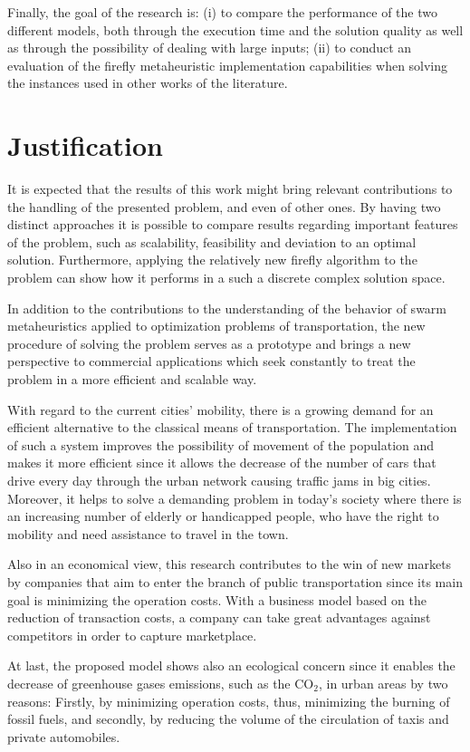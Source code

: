 \documentclass[tuberlin,cic,tc,openright,english,noabntcite,oneside]{iiufrgs}
\begin{document}
Finally, the goal of the research is: (i) to compare the performance of the two different models, both through the execution time and the solution quality as well as through the possibility of dealing with large inputs; (ii) to conduct an evaluation of the firefly metaheuristic implementation capabilities when solving the instances used in other works of the literature.

\section{Justification}
It is expected that the results of this work might bring relevant contributions to the handling of the presented problem, and even of other ones. By having two distinct approaches it is possible to compare results regarding important features of the problem, such as scalability, feasibility and deviation to an optimal solution. Furthermore, applying the relatively new firefly algorithm to the problem can show how it performs in a such a discrete complex solution space.

In addition to the contributions to the understanding of the behavior of swarm metaheuristics applied to optimization problems of transportation, the new procedure of solving the problem serves as a prototype and brings a new perspective to commercial applications which seek constantly to treat the problem in a more efficient and scalable way.

With regard to the current cities' mobility, there is a growing demand for an efficient alternative to the classical means of transportation. The implementation of such a system improves the possibility of movement of the population and makes it more efficient since it allows the decrease of the number of cars that drive every day through the urban network causing traffic jams in big cities. Moreover, it helps to solve a demanding problem in today's society where there is an increasing number of elderly or handicapped people, who have the right to mobility and need assistance to travel in the town.

Also in an economical view, this research contributes to the win of new markets by companies that aim to enter the branch of public transportation since its main goal is minimizing the operation costs. With a business model based on the reduction of transaction costs, a company can take great advantages against competitors in order to capture marketplace.

At last, the proposed model shows also an ecological concern since it enables the decrease of greenhouse gases emissions, such as the CO$_{2}$, in urban areas by two reasons: Firstly, by minimizing operation costs, thus, minimizing the burning of fossil fuels, and secondly, by reducing the volume of the circulation of taxis and private automobiles.
\end{document}
